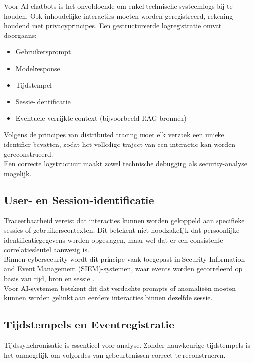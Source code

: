 Voor AI-chatbots is het onvoldoende om enkel technische systeemlogs bij te houden. Ook inhoudelijke interacties moeten worden geregistreerd, rekening houdend met privacyprincipes. Een gestructureerde logregistratie omvat doorgaans:

\begin{itemize}
    \item Gebruikersprompt
    \item Modelresponse
    \item Tijdstempel
    \item Sessie-identificatie
    \item Eventuele verrijkte context (bijvoorbeeld RAG-bronnen)
\end{itemize}

Volgens de principes van distributed tracing \autocite{sigelman2010dapper} moet elk verzoek een unieke identifier bevatten, zodat het volledige traject van een interactie kan worden gereconstrueerd.\\

Een correcte logstructuur maakt zowel technische debugging als security-analyse mogelijk.

\subsection{User- en Session-identificatie}

Traceerbaarheid vereist dat interacties kunnen worden gekoppeld aan specifieke sessies of gebruikerscontexten. Dit betekent niet noodzakelijk dat persoonlijke identificatiegegevens worden opgeslagen, maar wel dat er een consistente correlatiesleutel aanwezig is.\\

Binnen cybersecurity wordt dit principe vaak toegepast in Security Information and Event Management (SIEM)-systemen, waar events worden gecorreleerd op basis van tijd, bron en sessie \autocite{kotenko2022securityCorrelation}.\\

Voor AI-systemen betekent dit dat verdachte prompts of anomalieën moeten kunnen worden gelinkt aan eerdere interacties binnen dezelfde sessie.

\subsection{Tijdstempels en Eventregistratie}

Tijdssynchronisatie is essentieel voor analyse. Zonder nauwkeurige tijdstempels is het onmogelijk om volgordes van gebeurtenissen correct te reconstrueren.\\

